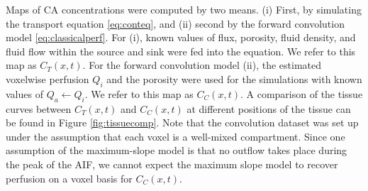 \documentclass[paper=a4, fontsize=11pt,parskip=half,headings=small]{scrartcl}
\newcommand{\Perf}{Q}
\begin{document}
	Maps of CA concentrations were computed by two means. (i) First, by simulating the transport equation \eqref{eq:conteq}, and (ii) second by the forward convolution model \eqref{eq:classicalperf}. For (i), known values of flux, porosity, fluid density, and fluid flow within the source and sink were fed into the equation. We refer to this map as $C_T(x,t)$. For the forward convolution model (ii), the estimated voxelwise perfusion $\Perf_i$ and the porosity were used for the simulations with known values of $\Perf_a \leftarrow \Perf_i$. We refer to this map as $C_C(x,t)$. 
	A comparison of the tissue curves between $C_T(x,t)$ and $C_C(x,t)$ at different positions of the tissue can be found in Figure \ref{fig:tissuecomp}. 
	Note that the convolution dataset was set up under the assumption that each voxel is a well-mixed compartment.
	Since one assumption of the maximum-slope model is that no outflow takes place during the peak of the AIF, we cannot expect the maximum slope model to recover perfusion on a voxel basis for $C_C(x,t)$.
\end{document}
